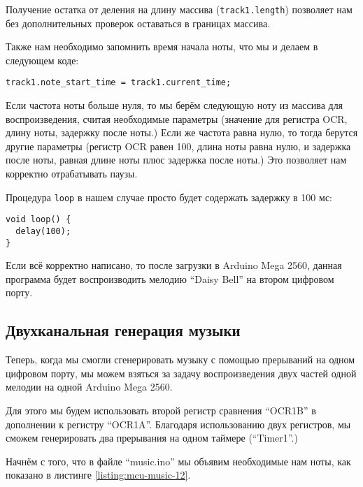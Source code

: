 \documentclass[../sparc.tex]{subfiles}
\begin{document}
Получение остатка от деления на длину массива (\texttt{track1.length})
позволяет нам без дополнительных проверок оставаться в границах массива.

Также нам необходимо запомнить время начала ноты, что мы и делаем в следующем
коде:

\begin{verbatim}
track1.note_start_time = track1.current_time;
\end{verbatim}

Если частота ноты больше нуля, то мы берём следующую ноту из массива для
воспроизведения, считая необходимые параметры (значение для регистра OCR, длину
ноты, задержку после ноты.)  Если же частота равна нулю, то тогда берутся другие
параметры (регистр OCR равен 100, длина ноты равна нулю, и задержка после ноты,
равная длине ноты плюс задержка после ноты.)  Это позволяет нам корректно
отрабатывать паузы.

Процедура \texttt{loop} в нашем случае просто будет содержать задержку
в 100 мс:

\begin{verbatim}
void loop() {
  delay(100);
}
\end{verbatim}

Если всё корректно написано, то после загрузки в Arduino Mega 2560, данная
программа будет воспроизводить мелодию ``Daisy Bell'' на втором цифровом порту.

\newpage
\subsection{Двухканальная генерация музыки}

Теперь, когда мы смогли сгенерировать музыку с помощью прерываний на одном
цифровом порту, мы можем взяться за задачу воспроизведения двух частей одной
мелодии на одной Arduino Mega 2560.

Для этого мы будем использовать второй регистр сравнения ``OCR1B'' в дополнении
к регистру ``OCR1A''.  Благодаря использованию двух регистров, мы сможем
генерировать два прерывания на одном таймере (``Timer1''.)

Начнём с того, что в файле ``music.ino'' мы объявим необходимые нам ноты, как
показано в листинге \ref{listing:mcu-music-12}.
\end{document}
